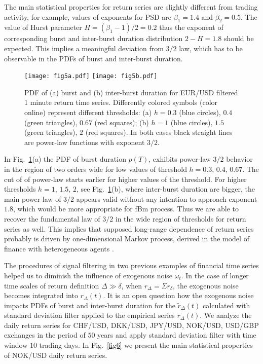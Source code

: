 \documentclass{article}
\newcommand\figref[1]{Fig.~\ref{#1}}
\begin{document}
The main statistical properties for return series are slightly different from trading activity, for example, values of exponents for PSD are  $\beta_1=1.4$ and $\beta_2=0.5$. The value of Hurst parameter $H=(\beta_1-1)/2=0.2$ thus the exponent of corresponding burst and inter-burst duration distribution $2-H=1.8$ should be expected. This implies a meaningful deviation from $3/2$ law, which has to be observable in the PDFs of burst and inter-burst duration. 

\begin{figure}[h]
\centering
\texttt{[image: fig5a.pdf]}
\texttt{[image: fig5b.pdf]}
\caption{\label{fig5} PDF of (a) burst and (b) inter-burst duration for EUR/USD filtered 1 minute return time series. Differently colored symbols (color online) represent different thresholds: (a) $h=0.3$ (blue circles), $0.4$ (green triangles), $0.67$ (red squares); (b) $h=1$ (blue circles), $1.5$ (green triangles), $2$ (red squares). In both cases black straight lines are power-law functions with exponent $3/2$.}
\end{figure}

In \figref{fig5}(a) the PDF of burst duration $p(T)$, exhibits power-law $3/2$ behavior in the region of two orders wide for low values of threshold  $h=0.3$, $0.4$, $0.67$. The cut of of power-law starts earlier for higher values of the threshold. For higher thresholds $h=1$, $1.5$, $2$, see \figref{fig5}(b), where inter-burst duration are bigger, the main power-law of $3/2$ appears valid without any intention to approach exponent $1.8$, which would be more appropriate for fBm process. Thus we are able to recover the fundamental law of $3/2$ in the wide region of thresholds for return series as well. This implies that supposed long-range dependence of return series probably is driven by one-dimensional Markov process, derived in the model of finance with heterogeneous agents  \cite{Gontis2014PlosOne,Gontis2016PhysA}.

The procedures of signal filtering in two previous examples of financial time series helped us to diminish the influence of exogenous noise $\omega_t$. In the case of longer time scales of return definition $\Delta\gg\delta$, when $r_{\Delta}=\Sigma r_{\delta}$, the exogenous noise becomes integrated into $r_{\Delta}(t)$. It is an open question how the exogenous noise impacts PDFs of burst and inter-burst duration for the $\tilde{r}_{\Delta}(t)$ calculated with standard deviation  filter applied to the empirical series $r_{\Delta}(t)$. We analyze the daily return series for CHF/USD, DKK/USD, JPY/USD, NOK/USD, USD/GBP exchanges in the period of $50$ years and apply standard deviation filter with time window $10$ trading days. In \figref{fig6} we present the main statistical properties of NOK/USD daily return series.
\end{document}
